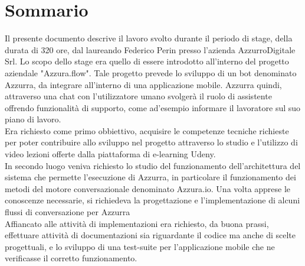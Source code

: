 
\cleardoublepage
{}
{}
\begingroup
\let\clearpage\relax
\let\cleardoublepage\relax
\let\cleardoublepage\relax

\chapter*{Sommario}

Il presente documento descrive il lavoro svolto durante il periodo di stage, della durata di 320 ore, dal laureando Federico Perin presso l'azienda AzzurroDigitale Srl.
Lo scopo dello stage era quello di essere introdotto all'interno del progetto aziendale "Azzura.flow". Tale progetto prevede lo sviluppo di un bot denominato Azzurra, da integrare all'interno di una applicazione mobile. Azzurra quindi, attraverso una chat con l'utilizzatore umano svolgerà il ruolo di assistente offrendo funzionalità di supporto, come ad'esempio informare il lavoratore sul suo piano di lavoro. \\
 Era richiesto come primo obbiettivo, acquisire le competenze tecniche richieste per poter contribuire allo sviluppo nel progetto attraverso lo studio e l'utilizzo di video lezioni offerte dalla piattaforma di e-learning Udeny.\\
  In secondo luogo veniva richiesto lo studio del funzionamento dell'architettura del sistema che permette l'esecuzione di Azzurra, in particolare il funzionamento dei metodi del motore conversazionale denominato Azzura.io. Una volta apprese le conoscenze necessarie, si richiedeva la progettazione e l'implementazione di alcuni flussi di conversazione per Azzurra \\
   Affiancato alle attività di implementazioni era richiesto, da buona prassi, effettuare attività di documentazioni sia riguardante il codice ma anche di scelte progettuali, e lo sviluppo di una test-suite per l'applicazione mobile che ne verificasse il corretto funzionamento.




%
%

\endgroup			

\vfill

